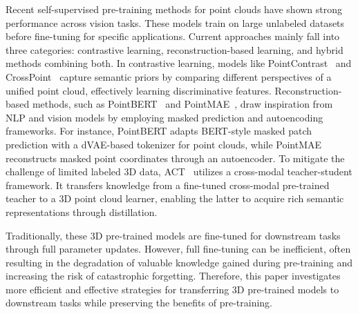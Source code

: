Recent self-supervised pre-training methods for point clouds have shown strong performance across vision tasks. These models train on large unlabeled datasets before fine-tuning for specific applications. Current approaches mainly fall into three categories: contrastive learning, reconstruction-based learning, and hybrid methods combining both.
In contrastive learning, models like PointContrast~\cite{xie2020pointcontrast} and CrossPoint~\cite{afham2022crosspoint} capture semantic priors by comparing different perspectives of a unified point cloud, effectively learning discriminative features. 
Reconstruction-based methods, such as PointBERT~\cite{yu2022point} and PointMAE~\cite{pang2022masked}, draw inspiration from NLP and vision models by employing masked prediction and autoencoding frameworks. For instance, PointBERT adapts BERT-style masked patch prediction with a dVAE-based tokenizer for point clouds, while PointMAE reconstructs masked point coordinates through an autoencoder. 
To mitigate the challenge of limited labeled 3D data, ACT~\cite{dong2022autoencoders} utilizes a cross-modal teacher-student framework. It transfers knowledge from a fine-tuned cross-modal pre-trained teacher to a 3D point cloud learner, enabling the latter to acquire rich semantic representations through distillation.

Traditionally, these 3D pre-trained models are fine-tuned for downstream tasks through full parameter updates. However, full fine-tuning can be inefficient, often resulting in the degradation of valuable knowledge gained during pre-training and increasing the risk of catastrophic forgetting. Therefore, this paper investigates more efficient and effective strategies for transferring 3D pre-trained models to downstream tasks while preserving the benefits of pre-training.

